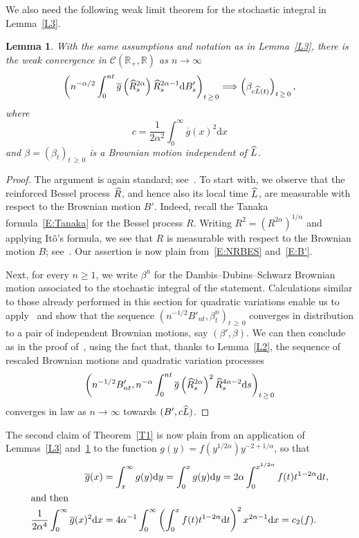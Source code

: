 \documentclass[10pt]{amsart}
\newtheorem{lemm}[theo]{Lemma}\newtheorem{prop}[theo]{Proposition}\newtheorem{coro}[theo]{Corollary}\newtheorem{conj}[theo]{Conjecture}
\theoremstyle{definition}\newtheorem{defi}[theo]{Definition}\newtheorem{rema}[theo]{Remark}\newtheorem{exam}[theo]{Example}\newtheorem{exem}[theo]{Example}\newtheorem{nota}[theo]{Notation}
\renewcommand{\bar}[1]{\overline{#1}}
\renewcommand{\hat}[1]{\widehat{#1}}
\newcommand{\dd}{\mathrm{d}}
\newcommand{\R}{\mathbb{R}}
\newcommand{\calC}{\mathcal{C}}
\let\oldhat\hat
\renewcommand*{\hat}[1]{\mathchoice{\widehat{#1}}{\widehat{#1}}{\oldhat{#1}}{\oldhat{#1}}}
\begin{document}
We also need the following weak limit theorem for the stochastic integral in Lemma~\ref{L3}.

\begin{lemm}\label{L4}
With the same assumptions and notation as in Lemma~\ref{L3}, there
is the weak convergence in $\calC(\R_+,\R)$ as $n\to \infty$
\[
\left(n^{-\alpha/2} \int_0^{nt} \bar g\left(\hat R^{2\alpha}_s\right) \hat R_s^{2\alpha-1} \dd B'_s \right)_{t\,\geq\,0} \Longrightarrow \left(\beta_{c\hat{L}(t)}\right)_{t\,\geq\,0},
\]
where
\[
c= \frac{1}{2 \alpha^2}\int_0^{\infty} \bar g(x)^2 \dd x
\]
and $\beta = (\beta_t)_{t\,\geq\,0}$ is a Brownian motion independent of $\hat{L}$.
\end{lemm}

\begin{proof}
The argument is again standard; see~\cite[Section~XIII.2]{RY}. To start with, we observe that
the reinforced Bessel process $\hat R$, and hence also its local time $\hat{L}$, are measurable with respect to the Brownian motion $B'$. Indeed, recall the Tanaka formula~\eqref{E:Tanaka} for the Bessel process $R$. Writing $R^2=(R^{2\alpha})^{1/\alpha}$ and applying Itô's formula, we see that $R$ is measurable with respect to the Brownian motion $B$; see~\cite[p.~439]{RY}. Our assertion is now plain from~\eqref{E:NRBES} and~\eqref{E:B'}.

Next, for every $n\geq 1$, we write $\beta^n$ for the Dambis--Dubins--Schwarz Brownian motion associated to the stochastic integral of the statement. Calculations similar to those already performed in this section for quadratic variations enable us to apply~\cite[Theorem~XIII.2.3]{RY} and show that the sequence $ (n^{-1/2} B'_{nt}, \beta^n_t)_{t\,\geq\,0}$ converges in distribution to a pair of independent Brownian motions, say $(\beta',\beta)$. We can then conclude as in the proof of~\cite[Theorem~XIII.2.6]{RY}, using the fact that, thanks to Lemma~\ref{L2}, the sequence of rescaled Brownian motions and quadratic variation processes
\[
\left(n^{-1/2} B'_{nt}, n^{-\alpha} \int_0^{nt} \bar g\left(\hat R^{2\alpha}_s\right)^2 \hat R_s^{4\alpha-2} \dd s\right)_{t\,\geq\,0}
\]
converges in law as $n\to \infty$ towards $(B',c \hat{L})$.
\end{proof}

The second claim of Theorem~\ref{T1} is now plain from an application of Lemmas~\ref{L3} and~\ref{L4} to the function $g(y)=f(y^{1/2\alpha}) y^{-2+1/\alpha}$, so that
\begin{align*}
\bar g(x)&=\int_x^{\infty} g(y) \dd y =\int_0^x g(y) \dd y = 2\alpha \int_0^{x^{1/2\alpha}} f(t) t^{1-2\alpha} \dd t,
\\
\intertext{and then}
\frac{1}{2 \alpha^4}\int_0^{\infty} \bar g(x)^2 \dd x &=4\alpha^{-1} \int_0^{\infty} \left(\int_{0} ^{x} f(t) t^{1-2\alpha} \dd t \right)^2 x^{2\alpha-1}\dd x
= c_2(f).
\end{align*}
\end{document}
